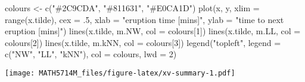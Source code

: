 \documentclass[
  a4paper,
]{article}
\newenvironment{Shaded}{\begin{snugshade}}{\end{snugshade}}
\newcommand{\AttributeTok}[1]{\textcolor[rgb]{0.77,0.63,0.00}{#1}}
\newcommand{\DecValTok}[1]{\textcolor[rgb]{0.00,0.00,0.81}{#1}}
\newcommand{\FunctionTok}[1]{\textcolor[rgb]{0.00,0.00,0.00}{#1}}
\newcommand{\NormalTok}[1]{#1}
\newcommand{\OtherTok}[1]{\textcolor[rgb]{0.56,0.35,0.01}{#1}}
\newcommand{\StringTok}[1]{\textcolor[rgb]{0.31,0.60,0.02}{#1}}
\theoremstyle{definition}
\theoremstyle{definition}
\theoremstyle{definition}
\theoremstyle{definition}
\theoremstyle{remark}
\begin{document}
\begin{Shaded}
\begin{Highlighting}[]
\NormalTok{colours }\OtherTok{\textless{}{-}} \FunctionTok{c}\NormalTok{(}\StringTok{"\#2C9CDA"}\NormalTok{, }\StringTok{"\#811631"}\NormalTok{, }\StringTok{"\#E0CA1D"}\NormalTok{)}
\FunctionTok{plot}\NormalTok{(x, y, }\AttributeTok{xlim =} \FunctionTok{range}\NormalTok{(x.tilde), }\AttributeTok{cex =}\NormalTok{ .}\DecValTok{5}\NormalTok{,}
     \AttributeTok{xlab =} \StringTok{"eruption time [mins]"}\NormalTok{,}
     \AttributeTok{ylab =} \StringTok{"time to next eruption [mins]"}\NormalTok{)}
\FunctionTok{lines}\NormalTok{(x.tilde, m.NW, }\AttributeTok{col =}\NormalTok{ colours[}\DecValTok{1}\NormalTok{])}
\FunctionTok{lines}\NormalTok{(x.tilde, m.LL, }\AttributeTok{col =}\NormalTok{ colours[}\DecValTok{2}\NormalTok{])}
\FunctionTok{lines}\NormalTok{(x.tilde, m.kNN, }\AttributeTok{col =}\NormalTok{ colours[}\DecValTok{3}\NormalTok{])}
\FunctionTok{legend}\NormalTok{(}\StringTok{"topleft"}\NormalTok{, }\AttributeTok{legend =} \FunctionTok{c}\NormalTok{(}\StringTok{"NW"}\NormalTok{, }\StringTok{"LL"}\NormalTok{, }\StringTok{"kNN"}\NormalTok{), }\AttributeTok{col =}\NormalTok{ colours,}
       \AttributeTok{lwd =} \DecValTok{2}\NormalTok{)}
\end{Highlighting}
\end{Shaded}

\texttt{[image: MATH5714M\_files/figure-latex/xv-summary-1.pdf]}

\clearpage
\end{document}
